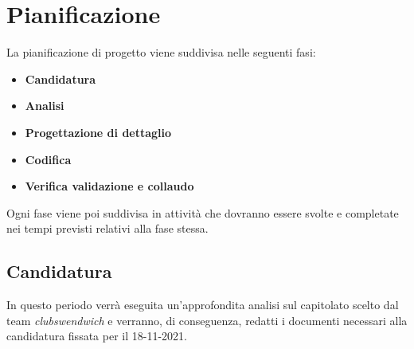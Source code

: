 \section{Pianificazione}
La pianificazione di progetto viene suddivisa nelle seguenti fasi:
\begin{itemize}
    \item \textbf{Candidatura}
    \item \textbf{Analisi}
    \item \textbf{Progettazione di dettaglio}
    \item \textbf{Codifica}
    \item \textbf{Verifica validazione e collaudo}
\end{itemize} 
Ogni fase viene poi suddivisa in attività che dovranno essere svolte e completate nei tempi previsti relativi alla fase stessa.

\subsection{Candidatura}
In questo periodo verrà eseguita un'approfondita analisi sul capitolato scelto dal team \textit{clubswendwich} e verranno, di conseguenza, redatti i documenti necessari alla candidatura fissata per il 18-11-2021.

